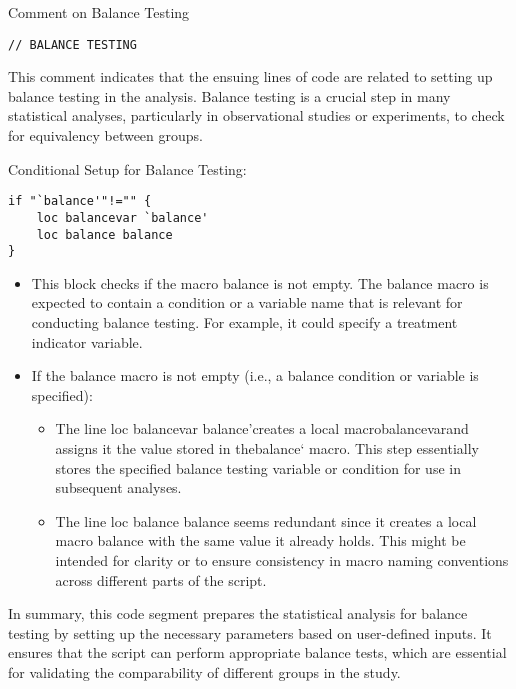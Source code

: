 \documentclass{article}
\begin{document}
Comment on Balance Testing
\begin{mdframed}
\begin{verbatim}
// BALANCE TESTING
\end{verbatim}
\end{mdframed}

\vspace{0.3cm} This comment indicates that the ensuing lines of code are related to setting up balance testing in the analysis. Balance testing is a crucial step in many statistical analyses, particularly in observational studies or experiments, to check for equivalency between groups.\newline

Conditional Setup for Balance Testing:
\begin{mdframed}
\begin{verbatim}
if "`balance'"!="" {
    loc balancevar `balance'
    loc balance balance 
}
\end{verbatim}
\end{mdframed}

\begin{itemize}
    \item This block checks if the macro balance is not empty. The balance macro is expected to contain a condition or a variable name that is relevant for conducting balance testing. For example, it could specify a treatment indicator variable.
    \item If the balance macro is not empty (i.e., a balance condition or variable is specified):
    \begin{itemize}
        \item The line loc balancevar balance'creates a local macrobalancevarand assigns it the value stored in thebalance` macro. This step essentially stores the specified balance testing variable or condition for use in subsequent analyses.
       \item The line loc balance balance seems redundant since it creates a local macro balance with the same value it already holds. This might be intended for clarity or to ensure consistency in macro naming conventions across different parts of the script.
    \end{itemize}
\end{itemize}

\vspace{0.3cm}In summary, this code segment prepares the statistical analysis for balance testing by setting up the necessary parameters based on user-defined inputs. It ensures that the script can perform appropriate balance tests, which are essential for validating the comparability of different groups in the study.
\end{document}
